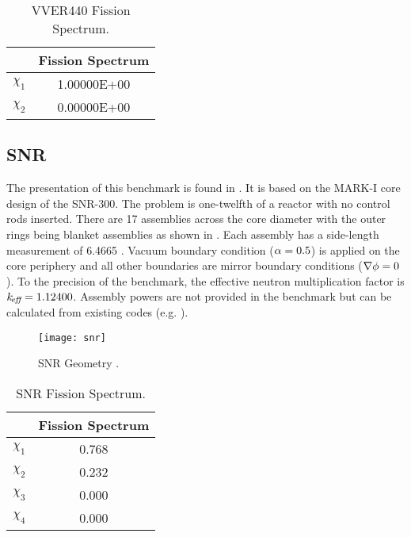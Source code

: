     \begin{table}
      \caption{VVER440 Fission Spectrum.}
      \label{tab:vver440chi}
      \begin{center}
        \begin{tabular}{cc}
          \toprule
          &Fission Spectrum \\
          \midrule
          $\chi_1$ & 1.00000E+00  \\
          $\chi_2$ & 0.00000E+00  \\
          \bottomrule
        \end{tabular}
      \end{center}
    \end{table}
  \subsection{SNR}
    \label{sec:snr}
    The presentation of this benchmark is found in \cite{argonneBenchmark}. It
    is based on the MARK-I core design of the SNR-300. The problem is
    one-twelfth of a reactor with no control rods inserted. There are 17
    assemblies across the core diameter with the outer rings being blanket
    assemblies as shown in . Each assembly has a side-length
    measurement of 6.4665 . Vacuum boundary condition ($\alpha =
    0.5$) is applied on the core periphery and all other boundaries are mirror
    boundary conditions ($\mathbf{\nabla} \phi = 0$). To the precision of the benchmark,
    the effective neutron multiplication factor is $k_{\!\mbox{\scriptsize \em eff}} = 1.12400$. Assembly
    powers are not provided in the benchmark but can be calculated from existing
    codes (e.g. \dif).
    \begin{figure}
      \centering
      \texttt{[image: snr]}
      \caption{SNR Geometry \cite{argonneBenchmark}.}
      \label{fig:snr_geom}
    \end{figure}
    \begin{table}
      \caption{SNR Fission Spectrum.}
      \label{tab:snrchi}
      \begin{center}
        \begin{tabular}{cc}
          \toprule
          &Fission Spectrum \\
          \midrule
          $\chi_1$ &0.768 \\
          $\chi_2$ &0.232 \\
          $\chi_3$ &0.000 \\
          $\chi_4$ &0.000 \\
          \bottomrule
        \end{tabular}
      \end{center}
    \end{table}
